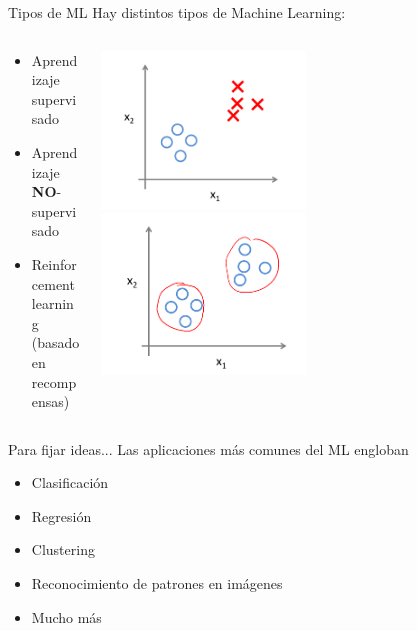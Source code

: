 \documentclass[11pt]{beamer}
\begin{document}
\begin{frame}{Tipos de ML}
Hay distintos tipos de Machine Learning:
\begin{columns}
\begin{column}{0.3\textwidth}
    \begin{itemize}
        \item Aprendizaje supervisado
        \item Aprendizaje \textbf{NO}-supervisado
        \item Reinforcement learning (basado en recompensas)
    \end{itemize}
\end{column}
\begin{column}{0.7\textwidth}
\includegraphics[width=0.5\textwidth]{images/supervised.png}
\includegraphics[width=0.5\textwidth]{images/unsupervised.png}
\end{column}
\end{columns}
\end{frame}
\begin{frame}{Para fijar ideas...}
    Las aplicaciones m\'as comunes del ML engloban
    \begin{itemize}
        \item Clasificaci\'on
        \item Regresi\'on
        \item Clustering
        \item Reconocimiento de patrones en im\'agenes
        \item Mucho m\'as
    \end{itemize}
\end{frame}
\end{document}
